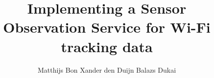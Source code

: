 \documentclass{tudelft-report}
\begin{document}
\frontmatter
\title[tudelft-white]{\fontsize{30}{5}\selectfont Implementing a Sensor Observation Service for Wi-Fi tracking data}
\author[tudelft-white]{\fontsize{15}{10}\selectfont Matthijs Bon
\vskip 0.15cm Xander den Duijn
\vskip 0.15cm Balazs Dukai}
\makecover[split]
	

\tableofcontents

\mainmatter






%
\nocite{*}
\printbibliography
\end{document}
